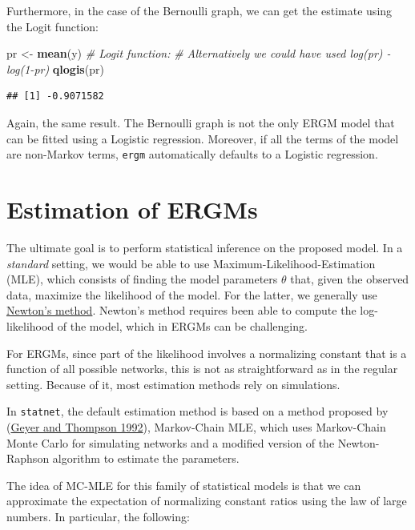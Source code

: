 \documentclass[
]{book}
\newenvironment{Shaded}{\begin{snugshade}}{\end{snugshade}}
\newcommand{\CommentTok}[1]{\textcolor[rgb]{0.56,0.35,0.01}{\textit{#1}}}
\newcommand{\FunctionTok}[1]{\textcolor[rgb]{0.13,0.29,0.53}{\textbf{#1}}}
\newcommand{\NormalTok}[1]{#1}
\newcommand{\OtherTok}[1]{\textcolor[rgb]{0.56,0.35,0.01}{#1}}
\begin{document}
Furthermore, in the case of the Bernoulli graph, we can get the estimate using the Logit function:

\begin{Shaded}
\begin{Highlighting}[]
\NormalTok{pr }\OtherTok{\textless{}{-}} \FunctionTok{mean}\NormalTok{(y)}
\CommentTok{\# Logit function:}
\CommentTok{\# Alternatively we could have used log(pr) {-} log(1{-}pr)}
\FunctionTok{qlogis}\NormalTok{(pr)}
\end{Highlighting}
\end{Shaded}

\begin{verbatim}
## [1] -0.9071582
\end{verbatim}

Again, the same result. The Bernoulli graph is not the only ERGM model that can be fitted using a Logistic regression. Moreover, if all the terms of the model are non-Markov terms, \texttt{ergm} automatically defaults to a Logistic regression.

\hypertarget{estimation-of-ergms}{%
\section{Estimation of ERGMs}\label{estimation-of-ergms}}

The ultimate goal is to perform statistical inference on the proposed model. In a \emph{standard} setting, we would be able to use Maximum-Likelihood-Estimation (MLE), which consists of finding the model parameters \(\theta\) that, given the observed data, maximize the likelihood of the model. For the latter, we generally use \href{https://en.wikipedia.org/wiki/Newton\%27s_method_in_optimization}{Newton's method}. Newton's method requires been able to compute the log-likelihood of the model, which in ERGMs can be challenging.

For ERGMs, since part of the likelihood involves a normalizing constant that is a function of all possible networks, this is not as straightforward as in the regular setting. Because of it, most estimation methods rely on simulations.

In \texttt{statnet}, the default estimation method is based on a method proposed by (\protect\hyperlink{ref-Geyer1992}{Geyer and Thompson 1992}), Markov-Chain MLE, which uses Markov-Chain Monte Carlo for simulating networks and a modified version of the Newton-Raphson algorithm to estimate the parameters.

The idea of MC-MLE for this family of statistical models is that we can approximate the expectation of normalizing constant ratios using the law of large numbers. In particular, the following:
\end{document}
